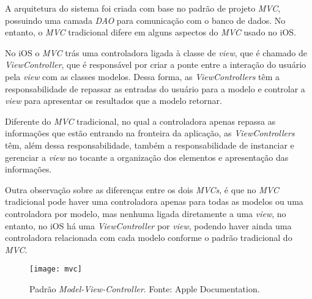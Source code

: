 A arquitetura do sistema foi criada com base no padrão de projeto \textit{MVC}, possuindo uma camada \textit{DAO} para comunicação 
com o banco de dados. No entanto, o \textit{MVC} tradicional difere em alguns aspectos do \textit{MVC} usado no iOS. 

No iOS o \textit{MVC} trás uma controladora ligada à classe de \textit{view}, que é chamado de \textit{ViewController}, que é responsável por 
criar a ponte entre a interação do usuário pela \textit{view} com as classes modelos. Dessa forma, as \textit{ViewControllers} têm a 
responsabilidade de repassar as entradas do usuário para a modelo e controlar a \textit{view} para apresentar os resultados que a modelo retornar.


Diferente do \textit{MVC} tradicional, no qual a controladora apenas repassa as informações que estão entrando na fronteira da aplicação, 
as \textit{ViewControllers} têm, além dessa responsabilidade, também a responsabilidade de instanciar e gerenciar a \textit{view} no tocante
a organização dos elementos e apresentação das informações.


Outra observação sobre as diferenças entre os dois \textit{MVCs}, é que no \textit{MVC} tradicional pode haver uma controladora apenas 
para todas as modelos ou uma controladora por modelo, mas nenhuma ligada diretamente a uma \textit{view}, no entanto, no iOS há uma 
\textit{ViewController} por \textit{view}, podendo haver ainda uma controladora relacionada com cada modelo conforme o padrão tradicional do \textit{MVC}.


\begin{figure}[h]
  \centering
    \texttt{[image: mvc]}
    \caption[Padrão \textit{Model-View-Controller}]{ Padrão \textit{Model-View-Controller}. Fonte: Apple Documentation.}
	\label{fig:mvc}
\end{figure}

